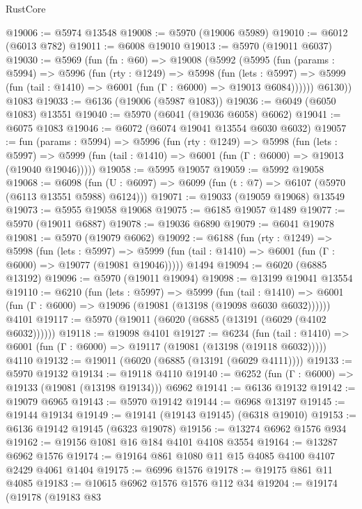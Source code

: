 \begin{lexlean}{RustCore}
\begin{coremodule}
@19006 := @5974 @13548
@19008 := @5970 (@19006 @5989)
@19010 := @6012 (@6013 @782)
@19011 := @6008 @19010
@19013 := @5970 (@19011 @6037)
@19030 := @5969
    (fun (fn : @60) =>
    @19008
      (@5992
        (@5995
          (fun (params : @5994) =>
          @5996
            (fun (rty : @1249) =>
            @5998
              (fun (lets : @5997) =>
              @5999 (fun (tail : @1410) => @6001 (fun (Γ : @6000) => @19013 @6084))))))
        @6130))
    @1083
@19033 := @6136 (@19006 (@5987 @1083))
@19036 := @6049 (@6050 @1083) @13551
@19040 := @5970 (@6041 (@19036 @6058) @6062)
@19041 := @6075 @1083
@19046 := @6072 (@6074 @19041 @13554 @6030 @6032)
@19057 := fun (params : @5994) =>
  @5996
    (fun (rty : @1249) =>
    @5998
      (fun (lets : @5997) =>
      @5999 (fun (tail : @1410) => @6001 (fun (Γ : @6000) => @19013 (@19040 @19046)))))
@19058 := @5995 @19057
@19059 := @5992 @19058
@19068 := @6098
    (fun (U : @6097) => @6099 (fun (t : @7) => @6107 (@5970 (@6113 @13551 @5988) @6124)))
@19071 := @19033 (@19059 @19068) @13549
@19073 := @5955 @19058 @19068
@19075 := @6185 @19057 @1489
@19077 := @5970 (@19011 @6887)
@19078 := @19036 @6890
@19079 := @6041 @19078
@19081 := @5970 (@19079 @6062)
@19092 := @6188
    (fun (rty : @1249) =>
    @5998
      (fun (lets : @5997) =>
      @5999 (fun (tail : @1410) => @6001 (fun (Γ : @6000) => @19077 (@19081 @19046)))))
    @1494
@19094 := @6020 (@6885 @13192)
@19096 := @5970 (@19011 @19094)
@19098 := @13199 @19041 @13554
@19110 := @6210
    (fun (lets : @5997) =>
    @5999
      (fun (tail : @1410) =>
      @6001 (fun (Γ : @6000) => @19096 (@19081 (@13198 (@19098 @6030 @6032))))))
    @4101
@19117 := @5970 (@19011 (@6020 (@6885 (@13191 (@6029 (@4102 @6032))))))
@19118 := @19098 @4101
@19127 := @6234
    (fun (tail : @1410) => @6001 (fun (Γ : @6000) => @19117 (@19081 (@13198 (@19118 @6032)))))
    @4110
@19132 := @19011 (@6020 (@6885 (@13191 (@6029 @4111))))
@19133 := @5970 @19132
@19134 := @19118 @4110
@19140 := @6252 (fun (Γ : @6000) => @19133 (@19081 (@13198 @19134))) @6962
@19141 := @6136 @19132
@19142 := @19079 @6965
@19143 := @5970 @19142
@19144 := @6968 @13197
@19145 := @19144 @19134
@19149 := @19141 (@19143 @19145) (@6318 @19010)
@19153 := @6136 @19142 @19145 (@6323 @19078)
@19156 := @13274 @6962 @1576 @934
@19162 := @19156 @1081 @16 @184 @4101 @4108 @3554
@19164 := @13287 @6962 @1576
@19174 := @19164 @861 @1080 @11 @15 @4085 @4100 @4107 @2429 @4061 @1404
@19175 := @6996 @1576
@19178 := @19175 @861 @11 @4085
@19183 := @10615 @6962 @1576 @1576 @112 @34
@19204 := @19174
    (@19178
      (@19183
        @83

\end{coremodule}
\end{lexlean}

